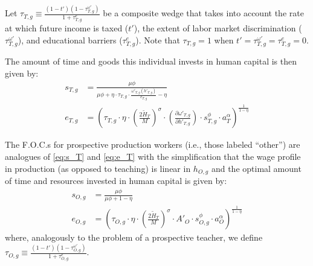 \documentclass[onehalfspacing,11pt]{article}
\begin{document}
	Let $\tau_{T,g} \equiv \frac{\left( 1-t' \right) \left( 1-\tau^{\omega '}_{T,g} \right)}{1+\tau^e_{T,g}}$ be a composite wedge that takes into account the rate at which future income is taxed ($t'$), the extent of labor market discrimination ($\tau^{\omega '}_{T,g}$), and educational barriers ($\tau^e_{T,g}$). Note that $\tau_{T,g}=1$ when $t' = \tau^{\omega '}_{T,g} = \tau^e_{T,g} = 0$.
	
	The amount of time and goods this individual invests in human capital is then given by:
	\begin{align}
		\label{eq:s_T}
		s_{T,g} & = \frac{\mu \phi}{\mu \phi+\eta \cdot \tau_{T,g} \cdot \tfrac{\omega'_{T,g}(h'_{T,g})}{e_{T,g}}-\eta}\\
		\label{eq:e_T}
		e_{T,g} & = \left( \tau_{T,g}\cdot \eta \cdot\left(\tfrac{2 \widetilde{H}_T}{M}\right)^\sigma \cdot\left(\tfrac{\partial \omega'_{T,g}}{\partial h'_{T,g}}\right) \cdot s_{T,g}^\phi \cdot a_T^\alpha \right)^{\frac{1}{1-\eta}}
	\end{align}
	
	
	The F.O.C.s for prospective production workers (i.e., those labeled ``other'') are analogues of \eqref{eq:s_T} and \eqref{eq:e_T} with the simplification that the wage profile in production (as opposed to teaching) is linear in $h_{O,g}$ and the optimal amount of time and resources invested in human capital is given by:
	\begin{align}
		s_{O,g} & = \frac{\mu \phi}{\mu \phi+1-\eta} \\
		\label{eq:e_O}
		e_{O,g} & = \left( \tau_{O,g} \cdot \eta \cdot \left(\tfrac{2\widetilde{H}_T}{M}\right)^\sigma\cdot {A'_{O}} \cdot s_{O,g}^\phi \cdot a_O^\alpha \right)^{\frac{1}{1-\eta}}
	\end{align}
	where, analogously to the problem of a prospective teacher, we define $\tau_{O,g} \equiv \frac{\left( 1-t' \right) \left( 1-\tau^{\omega '}_{O,g} \right)}{1+\tau^e_{O,g}}$.
	
\end{document}

